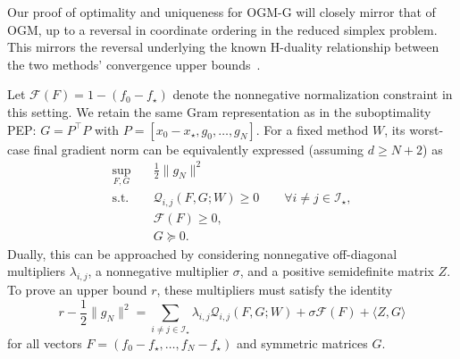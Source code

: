 \documentclass[11pt]{article}
\begin{document}
Our proof of optimality and uniqueness for OGM-G will closely mirror that of
OGM, up to a reversal in coordinate ordering in the reduced simplex problem.
This mirrors the reversal underlying the known H-duality relationship between
the two methods' convergence upper bounds~\cite{KOPR23}.

Let $\mathcal{F}(F)=1-(f_0-f_\star)$ denote the nonnegative normalization
constraint in this setting. We retain the same Gram representation as in the
suboptimality PEP: $G=P^\top P$ with
$P=[x_0-x_\star,g_0,\dots,g_N]$. For a fixed method $W$, its worst-case final
gradient norm can be equivalently expressed (assuming $d\geq N+2$) as
\begin{equation}\label{eq:ogmg-PEP-SDP}
\begin{aligned}
    \sup_{F,G}\quad &\frac12\|g_N\|^2\\
    \mathrm{s.t.}\quad
    &\mathcal Q_{i,j}(F,G;W)\geq0
    \qquad \forall i\neq j\in\mathcal I_\star,\\
    &\mathcal F(F)\geq0,\\
    &G\succeq0.
\end{aligned}
\end{equation}
Dually, this can be approached by considering nonnegative off-diagonal
multipliers $\lambda_{i,j}$, a nonnegative multiplier $\sigma$, and a positive
semidefinite matrix $Z$. To prove an upper bound $r$, these multipliers must
satisfy the identity
\begin{equation}\label{eq:ogmg-main-identity}
    r-\frac12\|g_N\|^2
    =\sum_{i\neq j\in\mathcal I_\star}\lambda_{i,j}
      \mathcal Q_{i,j}(F,G;W)
      +\sigma\mathcal F(F)+\langle Z,G\rangle
\end{equation}
for all vectors $F=(f_0-f_\star,\dots,f_N-f_\star)$ and symmetric matrices $G$.
\end{document}
